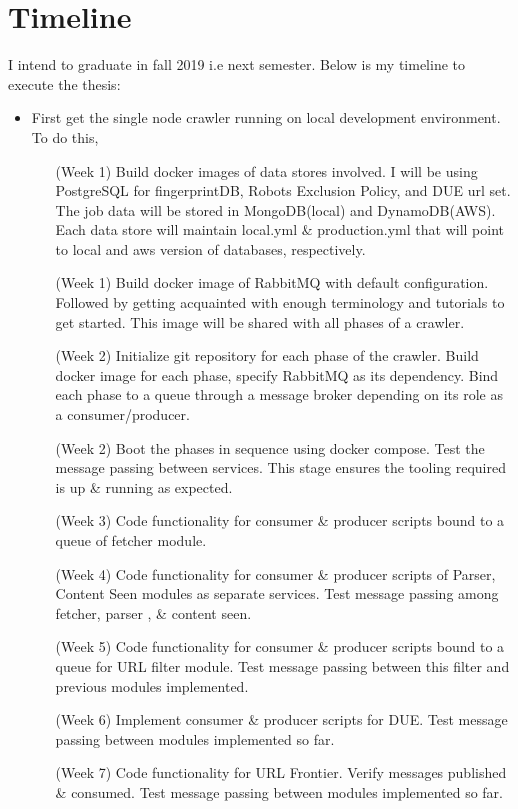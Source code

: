 \chapter{Timeline}
I intend to graduate in fall 2019 i.e next semester. Below is my timeline to execute the thesis:
\begin{itemize}
\item First get the single node crawler running on local development environment. To do this,
  \begin{itemize}
  \item[(Week 1)] Build docker images of data stores involved. I will be using PostgreSQL for
    fingerprintDB, Robots Exclusion Policy, and DUE url set. The job data will be stored in MongoDB(local)
    and DynamoDB(AWS). Each data store will maintain local.yml
    \& production.yml that will point to local and aws version of databases, respectively.
  \item[(Week 1)] Build docker image of RabbitMQ with default configuration. Followed by getting acquainted with enough terminology and tutorials to get started. This image will be shared with all phases of a
    crawler.
  \item [(Week 2)]Initialize git repository for each phase of the crawler. Build docker image for each phase,
    specify RabbitMQ as its dependency. Bind each phase to a queue through a message broker depending
    on its role as a consumer/producer.
  \item[(Week 2)] Boot the phases in sequence using docker compose. Test the message passing between services.
    This stage ensures the tooling required is up \& running as expected.
  \item[(Week 3)] Code functionality for consumer \& producer scripts bound to a queue of fetcher module. 
  \item[(Week 4)] Code functionality for consumer \& producer scripts of Parser, Content Seen modules as separate
    services. Test message passing among fetcher, parser , \& content seen.
  \item[(Week 5)] Code functionality for consumer \& producer scripts bound to a queue for URL filter module. Test
    message passing between this filter and previous modules implemented.
  \item[(Week 6)] Implement consumer \& producer scripts for DUE. Test message passing between modules implemented
    so far.
  \item[(Week 7)] Code functionality for URL Frontier. Verify messages published \& consumed. Test message passing between modules implemented so far.

\end{itemize}
\end{itemize}
